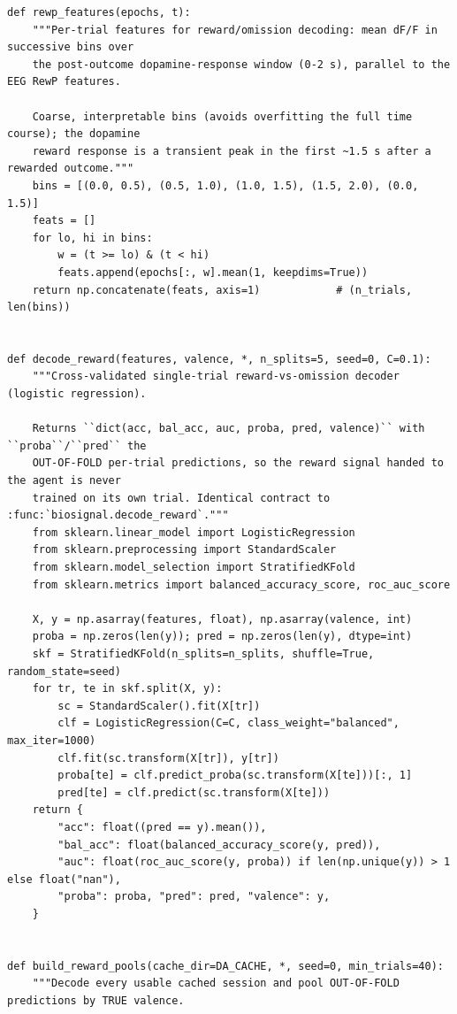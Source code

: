 \begin{lstlisting}[caption={mrl\_trace/dopamine.py},label={lst:siox-src-dopamine}]
def rewp_features(epochs, t):
    """Per-trial features for reward/omission decoding: mean dF/F in successive bins over
    the post-outcome dopamine-response window (0-2 s), parallel to the EEG RewP features.

    Coarse, interpretable bins (avoids overfitting the full time course); the dopamine
    reward response is a transient peak in the first ~1.5 s after a rewarded outcome."""
    bins = [(0.0, 0.5), (0.5, 1.0), (1.0, 1.5), (1.5, 2.0), (0.0, 1.5)]
    feats = []
    for lo, hi in bins:
        w = (t >= lo) & (t < hi)
        feats.append(epochs[:, w].mean(1, keepdims=True))
    return np.concatenate(feats, axis=1)            # (n_trials, len(bins))


def decode_reward(features, valence, *, n_splits=5, seed=0, C=0.1):
    """Cross-validated single-trial reward-vs-omission decoder (logistic regression).

    Returns ``dict(acc, bal_acc, auc, proba, pred, valence)`` with ``proba``/``pred`` the
    OUT-OF-FOLD per-trial predictions, so the reward signal handed to the agent is never
    trained on its own trial. Identical contract to :func:`biosignal.decode_reward`."""
    from sklearn.linear_model import LogisticRegression
    from sklearn.preprocessing import StandardScaler
    from sklearn.model_selection import StratifiedKFold
    from sklearn.metrics import balanced_accuracy_score, roc_auc_score

    X, y = np.asarray(features, float), np.asarray(valence, int)
    proba = np.zeros(len(y)); pred = np.zeros(len(y), dtype=int)
    skf = StratifiedKFold(n_splits=n_splits, shuffle=True, random_state=seed)
    for tr, te in skf.split(X, y):
        sc = StandardScaler().fit(X[tr])
        clf = LogisticRegression(C=C, class_weight="balanced", max_iter=1000)
        clf.fit(sc.transform(X[tr]), y[tr])
        proba[te] = clf.predict_proba(sc.transform(X[te]))[:, 1]
        pred[te] = clf.predict(sc.transform(X[te]))
    return {
        "acc": float((pred == y).mean()),
        "bal_acc": float(balanced_accuracy_score(y, pred)),
        "auc": float(roc_auc_score(y, proba)) if len(np.unique(y)) > 1 else float("nan"),
        "proba": proba, "pred": pred, "valence": y,
    }


def build_reward_pools(cache_dir=DA_CACHE, *, seed=0, min_trials=40):
    """Decode every usable cached session and pool OUT-OF-FOLD predictions by TRUE valence.


\end{lstlisting}

